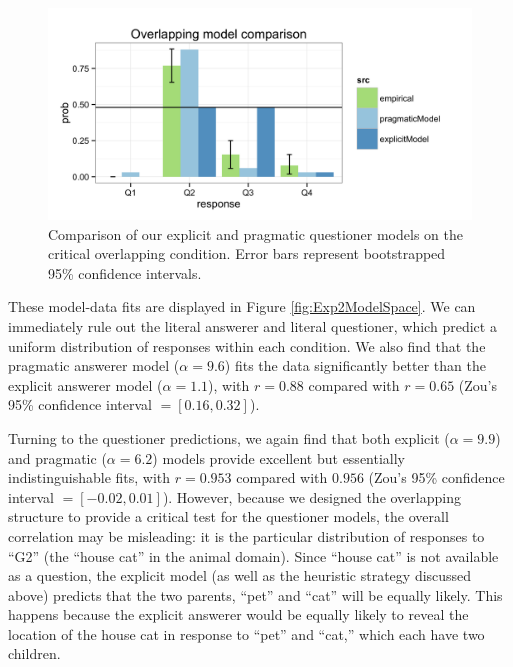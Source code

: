 \documentclass[12pt, floatsintext, jou]{apa6}
\begin{document}
%
\begin{figure}[t!]
\begin{center}
\includegraphics[scale=.25]{OverlappingModelComparison.png}
\end{center}
\vspace{-.5cm}
\caption{Comparison of our explicit and pragmatic questioner models on the critical overlapping condition.  Error bars represent bootstrapped 95\% confidence intervals. }
\label{fig:Exp4ZoomedIn}
\vspace{-.15cm}
\end{figure}
%
These model-data fits are displayed in Figure \ref{fig:Exp2ModelSpace}. We can immediately rule out the literal answerer and literal questioner, which predict a uniform distribution of responses within each condition. We also find that the pragmatic answerer model ($\alpha = 9.6$) fits the data significantly better than the explicit answerer model ($\alpha = 1.1$), with $r = 0.88$ compared with $r = 0.65$ (Zou's 95\% confidence interval $= [0.16, 0.32]$). 

Turning to the questioner predictions, we again find that both explicit ($\alpha = 9.9$) and pragmatic ($\alpha = 6.2$) models provide excellent but essentially indistinguishable fits, with $r = 0.953$ compared with $0.956$ (Zou's 95\% confidence interval $= [-0.02, 0.01]$). However, because we designed the overlapping structure to provide a critical test for the questioner models, the overall correlation may be misleading: it is the particular distribution of responses to ``G2'' (the ``house cat'' in the animal domain). Since ``house cat'' is not available as a question, the explicit model (as well as the heuristic strategy discussed above) predicts that the two parents, ``pet'' and ``cat'' will be equally likely. This happens because the explicit answerer would be equally likely to reveal the location of the house cat in response to ``pet'' and ``cat,'' which each have two children. 
\end{document}
